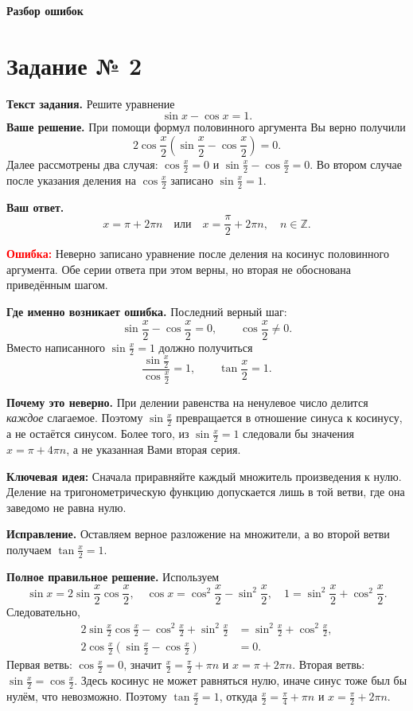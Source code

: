 \documentclass[12pt,a4paper]{article}
\newcommand{\err}{\textcolor{red}{Ошибка:}}
\newcommand{\idea}{\textcolor{blue!60!black}{Ключевая идея:}}
\begin{document}
\newpage
\thispagestyle{empty}
\vspace*{.37\textheight}
\begin{center}{\Huge\bfseries Разбор ошибок}\end{center}
\newpage

\label{task:2}
\section*{Задание № 2}
\textbf{Текст задания.} Решите уравнение
\[\sin x-\cos x=1.\]
\textbf{Ваше решение.} При помощи формул половинного аргумента Вы верно получили
\[
2\cos\frac x2\left(\sin\frac x2-\cos\frac x2\right)=0.
\]
Далее рассмотрены два случая: $\cos\frac x2=0$ и $\sin\frac x2-\cos\frac x2=0$.
Во втором случае после указания деления на $\cos\frac x2$ записано $\sin\frac x2=1$.

\textbf{Ваш ответ.}
\[x=\pi+2\pi n\quad\text{или}\quad x=\frac\pi2+2\pi n,\quad n\in\mathbb Z.\]

\textbf{\err} Неверно записано уравнение после деления на косинус половинного аргумента. Обе серии ответа при этом верны, но вторая не обоснована приведённым шагом.

\textbf{Где именно возникает ошибка.} Последний верный шаг:
\[\sin\frac x2-\cos\frac x2=0,\qquad \cos\frac x2\ne0.\]
Вместо написанного $\sin\frac x2=1$ должно получиться
\[\frac{\sin\frac x2}{\cos\frac x2}=1,\qquad \tan\frac x2=1.\]

\textbf{Почему это неверно.} При делении равенства на ненулевое число делится \emph{каждое} слагаемое. Поэтому $\sin\frac x2$ превращается в отношение синуса к косинусу, а не остаётся синусом. Более того, из $\sin\frac x2=1$ следовали бы значения $x=\pi+4\pi n$, а не указанная Вами вторая серия.

\textbf{\idea} Сначала приравняйте каждый множитель произведения к нулю. Деление на тригонометрическую функцию допускается лишь в той ветви, где она заведомо не равна нулю.

\textbf{Исправление.} Оставляем верное разложение на множители, а во второй ветви получаем $\tan\frac x2=1$.

\textbf{Полное правильное решение.} Используем
\[\sin x=2\sin\frac x2\cos\frac x2,\quad
\cos x=\cos^2\frac x2-\sin^2\frac x2,\quad
1=\sin^2\frac x2+\cos^2\frac x2.\]
Следовательно,
\begin{align*}
2\sin\frac x2\cos\frac x2-\cos^2\frac x2+\sin^2\frac x2
 &=\sin^2\frac x2+\cos^2\frac x2,\\
2\cos\frac x2\left(\sin\frac x2-\cos\frac x2\right)&=0.
\end{align*}
Первая ветвь: $\cos\frac x2=0$, значит $\frac x2=\frac\pi2+\pi n$ и $x=\pi+2\pi n$.
Вторая ветвь: $\sin\frac x2=\cos\frac x2$. Здесь косинус не может равняться нулю, иначе синус тоже был бы нулём, что невозможно. Поэтому $\tan\frac x2=1$, откуда $\frac x2=\frac\pi4+\pi n$ и $x=\frac\pi2+2\pi n$.
\end{document}
